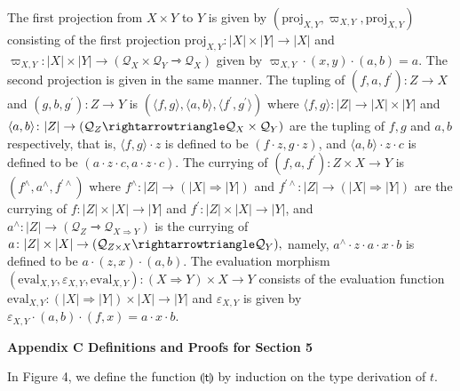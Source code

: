 \documentclass[10pt,a4paper]{amsart}
\begin{document}
The first projection from $X\times Y$ to $Y$ is given by $(\mathrm{proj}_{X,Y},\varpi_{X,Y},\mathrm{proj}_{X,Y})$ consisting of the first projection $\mathrm{proj}_{X,Y}\colon|X|\times|Y|\to|X|$ and $\varpi_{X,Y}\colon|X|\times|Y|\to(\mathcal{Q}_{X}\times\mathcal{Q}_{Y}%
\rightarrowtriangle\mathcal{Q}_{X})$ given by $\varpi_{X,Y}\cdot(x,y)\cdot(a,b)=a$. The second projection is given in the same manner. The tupling of $(f,a,f^{\prime})\colon Z\to X$ and $(g,b,g^{\prime})\colon Z\to Y$ is $(\langle f,g\rangle,\langle a,b\rangle,\langle f^{\prime},g^{\prime}\rangle)$ where $\langle f,g\rangle\colon|Z|\to|X|\times|Y|$ and $\langle a,b\rangle\colon|Z|\to(\mathcal{Q}_{Z}\rightarrowtriangle\mathcal{Q}_{%
X}\times\mathcal{Q}_{Y})$ are the tupling of $f,g$ and $a,b$ respectively, that is, $\langle f,g\rangle\cdot z$ is defined to be $(f\cdot z,g\cdot z)$, and $\langle a,b\rangle\cdot z\cdot c$ is defined to be $(a\cdot z\cdot c,a\cdot z\cdot c)$. The currying of $(f,a,f^{\prime})\colon Z\times X\to Y$ is $(f^{\wedge},a^{\wedge},f^{\prime\wedge})$ where $f^{\wedge}\colon|Z|\to(|X|\Rightarrow|Y|)$ and $f^{\prime\wedge}\colon|Z|\to(|X|\Rightarrow|Y|)$ are the currying of $f\colon|Z|\times|X|\to|Y|$ and $f^{\prime}\colon|Z|\times|X|\to|Y|$, and $a^{\wedge}\colon|Z|\to(\mathcal{Q}_{Z}\rightarrowtriangle\mathcal{Q}_{X%
\Rightarrow Y})$ is the currying of $a\colon|Z|\times|X|\to(\mathcal{Q}_{Z\times X}\rightarrowtriangle\mathcal{Q}_{%
Y}),$ namely, $a^{\wedge}\cdot z\cdot a\cdot x\cdot b$ is defined to be $a\cdot(z,x)\cdot(a,b)$. The evaluation morphism $(\mathrm{eval}_{X,Y},\varepsilon_{X,Y},\mathrm{eval}_{X,Y})\colon(X\Rightarrow
Y%
)\times X\to Y$ consists of the evaluation function $\mathrm{eval}_{X,Y}\colon(|X|\Rightarrow|Y|)\times|X|\to|Y|$ and $\varepsilon_{X,Y}$ is given by $\varepsilon_{X,Y}\cdot(a,b)\cdot(f,x)=a\cdot x\cdot b.$\par
 
 


 
\par\medskip\noindent\textbf{Appendix C Definitions and Proofs for Section 5}\par
 
 
In Figure 4, we define the function $\llparenthesis\mathsf{t}\rrparenthesis$ by induction on the type derivation of $t$.\par
 
 
\end{document}
